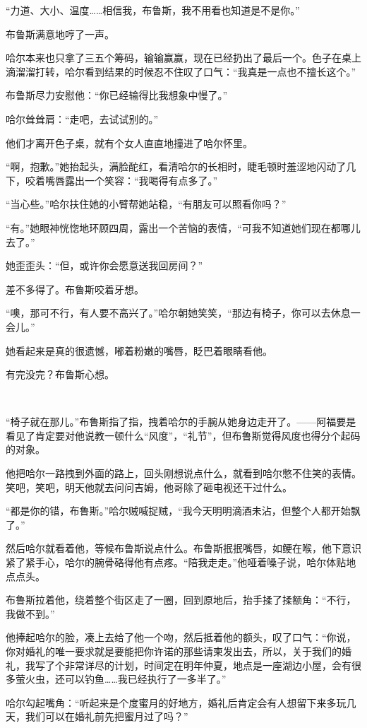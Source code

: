 \documentclass[../main]{subfiles}
\begin{document}
“力道、大小、温度……相信我，布鲁斯，我不用看也知道是不是你。”

布鲁斯满意地哼了一声。

哈尔本来也只拿了三五个筹码，输输赢赢，现在已经扔出了最后一个。色子在桌上滴溜溜打转，哈尔看到结果的时候忍不住叹了口气：“我真是一点也不擅长这个。”

布鲁斯尽力安慰他：“你已经输得比我想象中慢了。”

哈尔耸耸肩：“走吧，去试试别的。”

他们才离开色子桌，就有个女人直直地撞进了哈尔怀里。

“啊，抱歉。”她抬起头，满脸酡红，看清哈尔的长相时，睫毛顿时羞涩地闪动了几下，咬着嘴唇露出一个笑容：“我喝得有点多了。”

“当心些。”哈尔扶住她的小臂帮她站稳，“有朋友可以照看你吗？”

“有。”她眼神恍惚地环顾四周，露出一个苦恼的表情，“可我不知道她们现在都哪儿去了。”

她歪歪头：“但，或许你会愿意送我回房间？”

差不多得了。布鲁斯咬着牙想。

“噢，那可不行，有人要不高兴了。”哈尔朝她笑笑，“那边有椅子，你可以去休息一会儿。”

她看起来是真的很遗憾，嘟着粉嫩的嘴唇，眨巴着眼睛看他。

有完没完？布鲁斯心想。

~\

“椅子就在那儿。”布鲁斯指了指，拽着哈尔的手腕从她身边走开了。——阿福要是看见了肯定要对他说教一顿什么“风度”，“礼节”，但布鲁斯觉得风度也得分个起码的对象。

他把哈尔一路拽到外面的路上，回头刚想说点什么，就看到哈尔憋不住笑的表情。笑吧，笑吧，明天他就去问问吉姆，他哥除了砸电视还干过什么。

“都是你的错，布鲁斯。”哈尔贼喊捉贼，“我今天明明滴酒未沾，但整个人都开始飘了。”

然后哈尔就看着他，等候布鲁斯说点什么。布鲁斯抿抿嘴唇，如鲠在喉，他下意识紧了紧手心，哈尔的腕骨硌得他有点疼。“陪我走走。”他哑着嗓子说，哈尔体贴地点点头。

布鲁斯拉着他，绕着整个街区走了一圈，回到原地后，抬手揉了揉额角：“不行，我做不到。”

他捧起哈尔的脸，凑上去给了他一个吻，然后抵着他的额头，叹了口气：“你说，你对婚礼的唯一要求就是要能把你许诺的那些请柬发出去，所以，关于我们的婚礼，我写了个非常详尽的计划，时间定在明年仲夏，地点是一座湖边小屋，会有很多萤火虫，还可以钓鱼……我已经执行了一多半了。”

哈尔勾起嘴角：“听起来是个度蜜月的好地方，婚礼后肯定会有人想留下来多玩几天，我们可以在婚礼前先把蜜月过了吗？”
\end{document}

